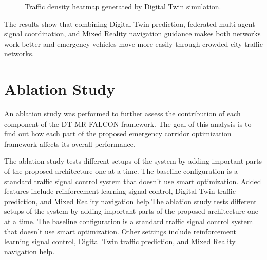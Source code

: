 \documentclass[conference]{IEEEtran}
\begin{document}
\begin{figure}[t]
\centering
{}
\caption{Traffic density heatmap generated by Digital Twin simulation.}
\label{fig:heatmap}
\end{figure}

The results show that combining Digital Twin prediction, federated multi-agent signal coordination, and Mixed Reality navigation guidance makes both networks work better and emergency vehicles move more easily through crowded city traffic networks.

\section{Ablation Study}
An ablation study was performed to further assess the contribution of each component of the DT-MR-FALCON framework. The goal of this analysis is to find out how each part of the proposed emergency corridor optimization framework affects its overall performance.

The ablation study tests different setups of the system by adding important parts of the proposed architecture one at a time. The baseline configuration is a standard traffic signal control system that doesn't use smart optimization. Added features include reinforcement learning signal control, Digital Twin traffic prediction, and Mixed Reality navigation help.The ablation study tests different setups of the system by adding important parts of the proposed architecture one at a time. The baseline configuration is a standard traffic signal control system that doesn't use smart optimization. Other settings include reinforcement learning signal control, Digital Twin traffic prediction, and Mixed Reality navigation help.
\end{document}
